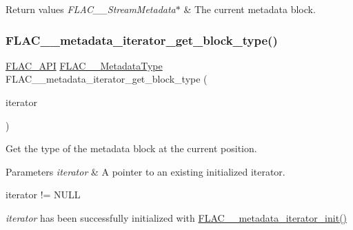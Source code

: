 \begin{DoxyRetVals}{Return values}
{\em F\+L\+A\+C\+\_\+\+\_\+\+Stream\+Metadata$\ast$} & The current metadata block. \\
\hline
\end{DoxyRetVals}
\mbox{\label{group__flac__metadata__level2_ga8221ea86b62119785c774aaece48a29b}} 
\subsubsection{\texorpdfstring{F\+L\+A\+C\+\_\+\+\_\+metadata\+\_\+iterator\+\_\+get\+\_\+block\+\_\+type()}{FLAC\_\_metadata\_iterator\_get\_block\_type()}}
{\footnotesize\ttfamily \hyperlink{group__flac__export_ga56ca07df8a23310707732b1c0007d6f5}{F\+L\+A\+C\+\_\+\+A\+PI} \hyperlink{group__flac__format_gac71714ba8ddbbd66d26bb78a427fac01}{F\+L\+A\+C\+\_\+\+\_\+\+Metadata\+Type} F\+L\+A\+C\+\_\+\+\_\+metadata\+\_\+iterator\+\_\+get\+\_\+block\+\_\+type (\begin{DoxyParamCaption}\item[{\hyperlink{zconf_8h_a2c212835823e3c54a8ab6d95c652660e}{const} \hyperlink{group__flac__metadata__level2_ga9f3e135a07cdef7e51597646aa7b89b2}{F\+L\+A\+C\+\_\+\+\_\+\+Metadata\+\_\+\+Iterator} $\ast$}]{iterator }\end{DoxyParamCaption})}

Get the type of the metadata block at the current position.


\begin{DoxyParams}{Parameters}
{\em iterator} & A pointer to an existing initialized iterator.  
\begin{DoxyCode}
iterator != NULL 
\end{DoxyCode}
 {\itshape iterator} has been successfully initialized with \hyperlink{group__flac__metadata__level2_ga4a5af69a1f19436b02f738eb8c97c959}{F\+L\+A\+C\+\_\+\+\_\+metadata\+\_\+iterator\+\_\+init()} \\
\hline
\end{DoxyParams}

